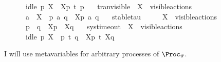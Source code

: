 \begin{isabellebody}
\ \ \ \ \ \ idle\ p\ X\ {\isasymLongrightarrow}\ {\isasymtheta}{\isacharbrackleft}{\kern0pt}X{\isacharbrackright}{\kern0pt}{\isacharparenleft}{\kern0pt}p{\isacharparenright}{\kern0pt}\ {\isasymlongmapsto}\isactrlsup {\isasymtheta}t{\isacharunderscore}{\kern0pt}{\isasymepsilon}\ {\isasymtheta}{\isacharparenleft}{\kern0pt}p{\isacharparenright}{\kern0pt}{\isacartoucheclose}\isanewline
\ \ {\isacharbar}{\kern0pt}\ tran{\isacharunderscore}{\kern0pt}visible{\isacharcolon}{\kern0pt}\ \ {\isacartoucheopen}X\ {\isasymsubseteq}\ visible{\isacharunderscore}{\kern0pt}actions\ {\isasymLongrightarrow}\ \isanewline
\ \ \ \ \ \ a\ {\isasymin}\ X\ {\isasymLongrightarrow}\ p\ {\isasymlongmapsto}a\ q\ {\isasymLongrightarrow}\ {\isasymtheta}{\isacharbrackleft}{\kern0pt}X{\isacharbrackright}{\kern0pt}{\isacharparenleft}{\kern0pt}p{\isacharparenright}{\kern0pt}\ {\isasymlongmapsto}\isactrlsup {\isasymtheta}a\ {\isasymtheta}{\isacharparenleft}{\kern0pt}q{\isacharparenright}{\kern0pt}{\isacartoucheclose}\isanewline
\ \ {\isacharbar}{\kern0pt}\ stable{\isacharunderscore}{\kern0pt}tau{\isacharcolon}{\kern0pt}\ \ \ \ \ \ {\isacartoucheopen}X\ {\isasymsubseteq}\ visible{\isacharunderscore}{\kern0pt}actions\ {\isasymLongrightarrow}\ \isanewline
\ \ \ \ \ \ p\ {\isasymlongmapsto}{\isasymtau}\ q\ {\isasymLongrightarrow}\ {\isasymtheta}{\isacharbrackleft}{\kern0pt}X{\isacharbrackright}{\kern0pt}{\isacharparenleft}{\kern0pt}p{\isacharparenright}{\kern0pt}\ {\isasymlongmapsto}\isactrlsup {\isasymtheta}{\isasymtau}\ {\isasymtheta}{\isacharbrackleft}{\kern0pt}X{\isacharbrackright}{\kern0pt}{\isacharparenleft}{\kern0pt}q{\isacharparenright}{\kern0pt}{\isacartoucheclose}\isanewline
\ \ {\isacharbar}{\kern0pt}\ sys{\isacharunderscore}{\kern0pt}timeout{\isacharcolon}{\kern0pt}\ \ {\isacartoucheopen}X\ {\isasymsubseteq}\ visible{\isacharunderscore}{\kern0pt}actions\ {\isasymLongrightarrow}\ \isanewline
\ \ \ \ \ \ idle\ p\ X\ {\isasymLongrightarrow}\ p\ {\isasymlongmapsto}t\ q\ {\isasymLongrightarrow}\ {\isasymtheta}{\isacharbrackleft}{\kern0pt}X{\isacharbrackright}{\kern0pt}{\isacharparenleft}{\kern0pt}p{\isacharparenright}{\kern0pt}\ {\isasymlongmapsto}\isactrlsup {\isasymtheta}t\ {\isasymtheta}{\isacharbrackleft}{\kern0pt}X{\isacharbrackright}{\kern0pt}{\isacharparenleft}{\kern0pt}q{\isacharparenright}{\kern0pt}{\isacartoucheclose}%
\begin{isamarkuptext}%
I will use metavariables  for arbitrary processes of $\Proc_\vartheta$.%

\end{isamarkuptext}
\end{isabellebody}
